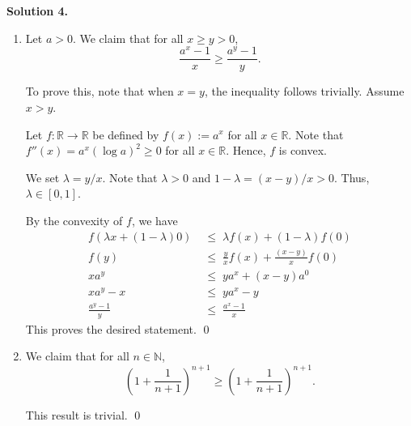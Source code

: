 \documentclass[10pt]{article}
\begin{document}
        \textbf{Solution 4.}
        \begin{enumerate}
                \item Let $a > 0$. We claim that for all $x \ge y > 0$,
                \[ \frac{a^x - 1}{x} \ge \frac{a^y - 1}{y}. \]

                To prove this, note that when $x = y$, the inequality follows trivially. Assume $x > y$.

                Let $f\colon \mathbb{R} \to \mathbb{R}$ be defined by $f(x) := a^x$ for all $x \in \mathbb{R}$.
                Note that $f''(x) = a^x (\log{a})^2 \ge 0$ for all $x \in \mathbb{R}$. Hence, $f$ is convex.

                We set $\lambda = y/x$. Note that $\lambda > 0$ and $1 - \lambda = (x - y) / x > 0$. Thus, $\lambda \in [0, 1]$.

                By the convexity of $f$, we have
                \begin{align*}
                        f(\lambda x + (1 - \lambda) 0) \;&\le\; \lambda f(x) + (1 - \lambda) f(0) \\
                        f(y) \;&\le\; \frac{y}{x}f(x) + \frac{(x - y)}{x} f(0) \\
                        x a^y \;&\le\; y a^x + (x - y) a^0 \\
                        x a^y - x \;&\le\; y a^x - y \\
                        \frac{a^y - 1}{y} \;&\le\; \frac{a^x - 1}{x}
                \end{align*}
                This proves the desired statement. \qed\\

                \item We claim that for all $n \in \mathbb{N}$,
                \[\left(1 + \frac{1}{n + 1}\right)^{n + 1} \ge \left(1 + \frac{1}{n + 1}\right)^{n + 1}.\]

                This result is trivial. \qed
        \end{enumerate}
\end{document}
